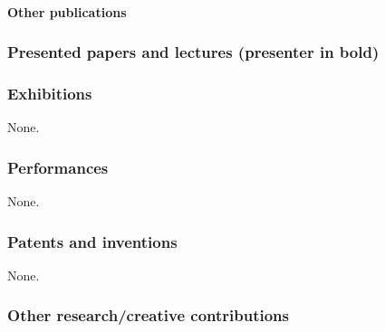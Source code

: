 \nocite{*}
\printbibliography[keyword=OaksPeerReviewed, heading=none]

\paragraph{Other publications}


\subsubsection{Presented papers and lectures (presenter in bold)}






\subsubsection{Exhibitions}
None.

\subsubsection{Performances}
None.

\subsubsection{Patents and inventions}
None.

\subsubsection{Other research/creative contributions}
 
